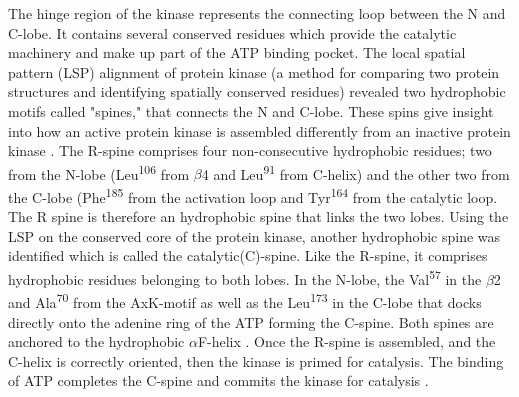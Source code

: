 \documentclass[a4paper, 11pt]{article}
\begin{document}
The hinge region of the kinase represents the connecting loop between the N and C-lobe. It contains several conserved residues which provide the catalytic machinery and make up part of the ATP binding pocket. The local spatial pattern (LSP) alignment of protein kinase (a method for comparing two protein structures and identifying spatially conserved residues) revealed two hydrophobic motifs called "spines," that connects the N and C-lobe. These spins give insight into how an active protein kinase is assembled differently from an inactive protein kinase \cite{taylor2011protein}. The R-spine comprises four non-consecutive hydrophobic residues; two from the N-lobe (Leu\textsuperscript{106} from $\beta$4 and Leu\textsuperscript{91} from C-helix) and the other two from the C-lobe (Phe\textsuperscript{185} from the activation loop and Tyr\textsuperscript{164}  from the catalytic loop. The R spine is therefore an hydrophobic spine that links the two lobes. Using the LSP on the conserved core of the protein kinase, another hydrophobic spine was identified which is called the catalytic(C)-spine. Like the R-spine, it comprises hydrophobic residues belonging to both lobes. In the N-lobe, the Val\textsuperscript{57} in the $\beta$2 and Ala\textsuperscript{70} from the AxK-motif as well as the Leu\textsuperscript{173} in the C-lobe that docks directly onto the adenine ring of the ATP forming the C-spine. Both spines are anchored to the hydrophobic $\alpha$F-helix . Once the R-spine is assembled, and the C-helix is correctly oriented, then the kinase is primed for catalysis. The binding of ATP completes the C-spine and commits the kinase for catalysis \cite{taylor2011protein,fabbro2015ten,roskoski2016classification}.
\end{document}
